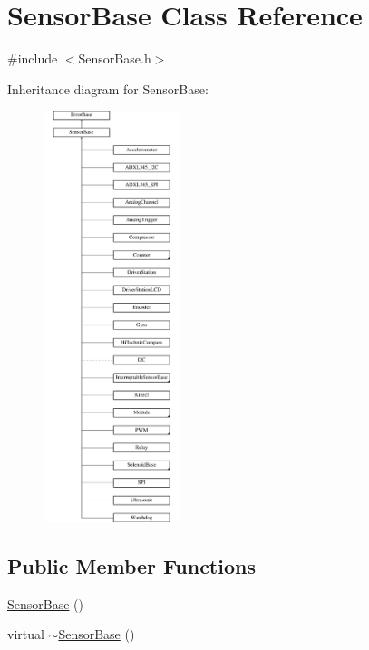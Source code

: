 \hypertarget{classSensorBase}{
\section{SensorBase Class Reference}
\label{classSensorBase}
}


{\ttfamily \#include $<$SensorBase.h$>$}

Inheritance diagram for SensorBase:\begin{figure}[H]
\begin{center}
\leavevmode
\includegraphics[height=12.000000cm]{classSensorBase}
\end{center}
\end{figure}
\subsection*{Public Member Functions}
\begin{DoxyCompactItemize}
\item 
\hyperlink{classSensorBase_a4e1878930538022da5ac42038d754e0e}{SensorBase} ()
\item 
virtual \hyperlink{classSensorBase_af38b2b0e047cb4f0304fc4c204c420fa}{$\sim$SensorBase} ()
\end{DoxyCompactItemize}
